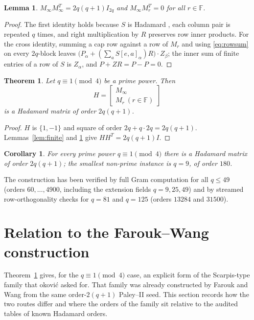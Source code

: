 \documentclass[11pt]{article}
\newtheorem{theorem}{Theorem}
\newtheorem{lemma}{Lemma}
\newtheorem{corollary}{Corollary}
\newcommand{\F}{\mathbb F}
\begin{document}
\begin{lemma}\label{lem:cap}
\(M_\infty M_\infty^{T}=2q(q+1)I_{2q}\) and \(M_\infty M_r^{T}=0\) for all
\(r\in\F\).
\end{lemma}

\begin{proof}
The first identity holds because \(S\) is Hadamard \cite{Paley1933}, each column pair is
repeated \(q\) times, and right multiplication by \(R\) preserves row
inner products.  For the cross identity, summing a cap row against a row
of \(M_r\) and using \eqref{eq:rowsum} on every \(2q\)-block leaves
\(\bigl(P_\alpha+(\sum_{a}S[e,a]_\alpha)R\bigr)\cdot Z_\beta\); the inner
sum of finite entries of a row of \(S\) is \(Z_\alpha\), and
\(P+ZR=P-P=0\).
\end{proof}

\begin{theorem}\label{thm:main}
Let \(q\equiv1\pmod4\) be a prime power.  Then
\[
        H=\begin{bmatrix}M_\infty\\ M_r\ (r\in\F)\end{bmatrix}
\]
is a Hadamard matrix of order \(2q(q+1)\).
\end{theorem}

\begin{proof}
\(H\) is \(\{1,-1\}\) and square of order \(2q+q\cdot2q=2q(q+1)\).
Lemmas~\ref{lem:finite} and \ref{lem:cap} give
\(HH^{T}=2q(q+1)I\).
\end{proof}

\begin{corollary}
For every prime power \(q\equiv1\pmod4\) there is a Hadamard matrix of
order \(2q(q+1)\); the smallest non-prime instance is \(q=9\), of order
\(180\).
\end{corollary}

The construction has been verified by full Gram computation for all
\(q\le49\) (orders \(60,\dots,4900\), including the extension fields
\(q=9,25,49\)) and by streamed row-orthogonality checks for \(q=81\) and
\(q=125\) (orders \(13284\) and \(31500\)).

\section{Relation to the Farouk--Wang construction}

Theorem~\ref{thm:main} gives, for the \(q\equiv1\pmod4\) case, an
explicit form of the Scarpis-type family that \DJ okovi\'c
\cite{Djokovic2016} asked for.  That family was already constructed by
Farouk and Wang \cite{FaroukWang2020,FaroukWang2022} from the same
order-\(2(q+1)\) Paley--II seed.  This section records how the two
routes differ and where the orders of the family sit relative to the
audited tables of known Hadamard orders.
\end{document}
